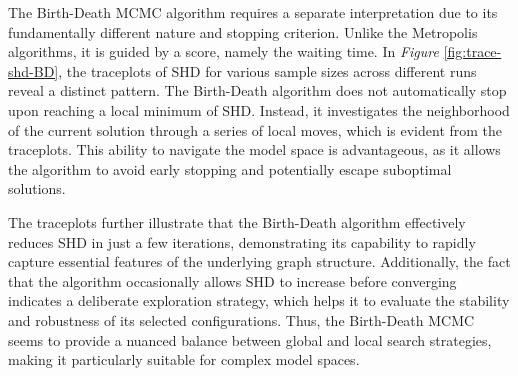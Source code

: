 \documentclass{report}
\begin{document}
The Birth-Death MCMC algorithm requires a separate interpretation due to its fundamentally different nature and stopping criterion. Unlike the Metropolis algorithms, it is guided by a score, namely the waiting time.
In \textit{Figure} \ref{fig:trace-shd-BD}, the traceplots of SHD for various sample sizes across different runs reveal a distinct pattern. The Birth-Death algorithm does not automatically stop upon reaching a local minimum of SHD. Instead, it investigates the neighborhood of the current solution through a series of local moves, which is evident from the traceplots. This ability to navigate the model space is advantageous, as it allows the algorithm to avoid early stopping and potentially escape suboptimal solutions.

The traceplots further illustrate that the Birth-Death algorithm effectively reduces SHD in just a few iterations, demonstrating its capability to rapidly capture essential features of the underlying graph structure. Additionally, the fact that the algorithm occasionally allows SHD to increase before converging indicates a deliberate exploration strategy, which helps it to evaluate the stability and robustness of its selected configurations. Thus, the Birth-Death MCMC seems to provide a nuanced balance between global and local search strategies, making it particularly suitable for complex model spaces.
\end{document}
